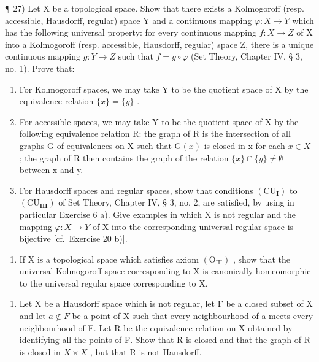 ¶ 27) Let X be a topological space. Show that there exists a Kolmogoroff (resp. accessible, Hausdorff, regular) space Y and a continuous mapping \(\varphi: X \to Y\) which has the following universal property: for every continuous mapping \(f: X \to Z\) of X into a Kolmogoroff (resp. accessible, Hausdorff, regular) space Z, there is a unique continuous mapping \(g: Y \to Z\) such that \(f = g \circ \varphi\) (Set Theory, Chapter IV, § 3, no. 1). Prove that:

\begin{enumerate}
\def\labelenumi{\alph{enumi})}
\item
  For Kolmogoroff spaces, we may take Y to be the quotient space of X by the equivalence relation \(\{\bar{x}\}=\{\bar{y}\}\) .
\item
  For accessible spaces, we may take Y to be the quotient space of X by the following equivalence relation R: the graph of R is the intersection of all graphs G of equivalences on X such that \(\mathrm{G}(x)\) is closed in x for each \(x \in X\) ; the graph of R then contains the graph of the relation \(\{\bar{x}\} \cap \{\bar{y}\} \neq \emptyset\) between x and y.
\item
  For Hausdorff spaces and regular spaces, show that conditions \((\mathrm{CU}_{\mathbf{I}})\) to \((\mathrm{CU}_{\mathbf{III}})\) of Set Theory, Chapter IV, § 3, no. 2, are satisfied, by using in particular Exercise 6 a). Give examples in which X is not regular and the mapping \(\varphi: X \to Y\) of X into the corresponding universal regular space is bijective {[}cf.~Exercise 20 b){]}.
\end{enumerate}

\begin{enumerate}
\def\labelenumi{\alph{enumi})}
\setcounter{enumi}{3}
\tightlist
\item
  If X is a topological space which satisfies axiom \((\mathrm{O}_{\mathrm{III}})\) , show that the universal Kolmogoroff space corresponding to X is canonically homeomorphic to the universal regular space corresponding to X.
\end{enumerate}

\begin{enumerate}
\def\labelenumi{\arabic{enumi})}
\setcounter{enumi}{27}
\tightlist
\item
  Let X be a Hausdorff space which is not regular, let F be a closed subset of X and let \(a \notin F\) be a point of X such that every neighbourhood of a meets every neighbourhood of F. Let R be the equivalence relation on X obtained by identifying all the points of F. Show that R is closed and that the graph of R is closed in \(X \times X\) , but that R is not Hausdorff.
\end{enumerate}

